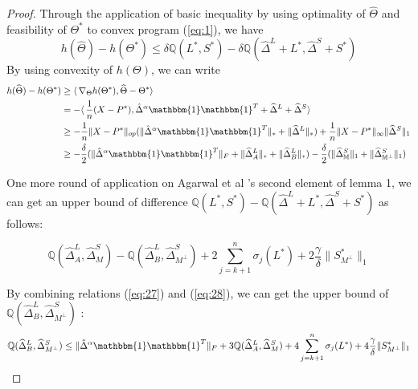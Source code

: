 \documentclass[AMS,STIX1COL]{WileyNJD-v2}
\begin{document}
\begin{proof}
Through the application of basic inequality by using optimality of $\widehat{\Theta}$ and feasibility of $\Theta^{*}$ to convex program (\ref{eq:1}), we have
\begin{equation}
    h(\widehat{\Theta}) - h(\Theta^{*})
    \leq \delta \mathbb{Q}(L^{*},S^{*}) - \delta \mathbb{Q}(\widehat{\Delta}^L + L^{*},\widehat{\Delta}^S + S^{*})
\end{equation}
By using convexity of $h(\Theta)$, we can write
\begin{align}
    h(\widehat{\Theta})-h(\Theta^{*}) &\geq 
    \langle\, \nabla_{\Theta}h(\Theta^{*}),\widehat{\Theta}-\Theta^{*}\rangle\ \nonumber \\
    &= - \langle\,\frac{1}{n} (X-P^{*}), \hat{\Delta}^{\alpha}\mathbbm{1}\mathbbm{1}^T + \widehat{\Delta}^{L} + \widehat{\Delta}^{S} \rangle\ \nonumber \\
    &\geq -\frac{1}{n} \|X - P^*\|_{op}(\|\hat{\Delta}^{\alpha}\mathbbm{1}\mathbbm{1}^T\|_\ast + \|\widehat{\Delta}^{L}\|_\ast) +  \frac{1}{n} \|X - P^*\|_{\infty}\|\widehat{\Delta}^{S}\|_{1} \nonumber \\ 
    &\geq -\frac{\delta}{2}(\|\hat{\Delta}^{\alpha}\mathbbm{1}\mathbbm{1}^T\|_F + \|\widehat{\Delta}^{L}_{A}\|_\ast + \|\widehat{\Delta}^{L}_{B}\|_\ast) - \frac{\delta}{2} (\|\widehat{\Delta}^{S}_{\mathbb{M}}\|_{1} + 
    \|\widehat{\Delta}^{S}_{\mathbb{M^\perp}}\|_{1}) \label{eq:27}
\end{align}

One more round of application on Agarwal et al \cite{agarwal2012noisy}'s second element of lemma 1, 
we can get an upper bound of difference $\mathbb{Q}(L^*,S^*)- \mathbb{Q}(\widehat{\Delta}^L + L^{*},\widehat{\Delta}^S + S^{*})$ as follows:  

\begin{equation} \label{eq:28}
    \mathbb{Q}(\widehat{\Delta}^L_{A},\widehat{\Delta}^S_{M}) - \mathbb{Q}(\widehat{\Delta}^L_{B},\widehat{\Delta}^S_{M^\perp})
    +2 \sum_{j=k+1}^{n} \sigma_{j}(L^*) + 2\frac{\gamma}{\delta}\|S^*_{M^\perp}\|_{1}
\end{equation}

By combining relations (\ref{eq:27}) and (\ref{eq:28}), we can get the upper bound of $\mathbb{Q}(\widehat{\Delta}^L_{B},\widehat{\Delta}^S_{M^\perp})$ : 
\begin{align*}
    \mathbb{Q}(\widehat{\Delta}^L_{B},\widehat{\Delta}^S_{M^\perp}) \leq 
    \|\hat{\Delta}^{\alpha}\mathbbm{1}\mathbbm{1}^T\|_{F} + 
    3\mathbb{Q}(\widehat{\Delta}^{L}_{A},\widehat{\Delta}^{S}_{M})+4 \sum_{j=k+1}^{n} \sigma_{j}(L^{*}) + 4\frac{\gamma}{\delta}   
    \|S^{*}_{M^\perp}\|_{1}
\end{align*}



\end{proof}
\end{document}
